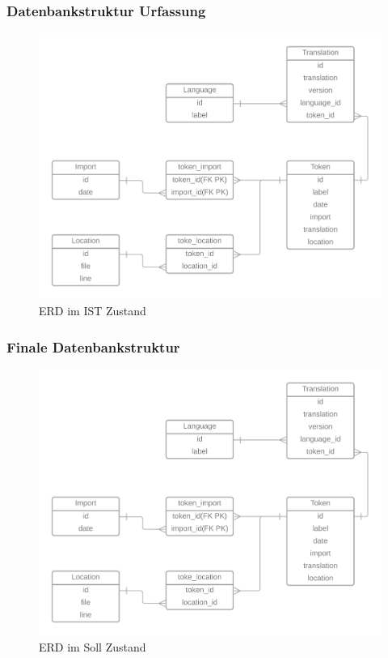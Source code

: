 \documentclass[10pt, oneside]{article}
\begin{document}
  \subsubsection{Datenbankstruktur Urfassung}\label{sec:erd:is}
  \begin{figure}[ht]
    \label{abb:erdIs1}
    \centering
    \includegraphics[width=\textwidth]{ERD_TranslationService_IST-Analyse.png}
    \caption{ERD im IST Zustand}
  \end{figure}
  \subsubsection{Finale Datenbankstruktur}\label{sec:erd:final}
  \begin{figure}[ht]
    \label{abb:erd:final}
    \centering
    \includegraphics[width=\textwidth]{ERD_TranslationService_IST-Analyse.png}
    \caption{ERD im Soll Zustand}
  \end{figure}
  \newpage
\end{document}
